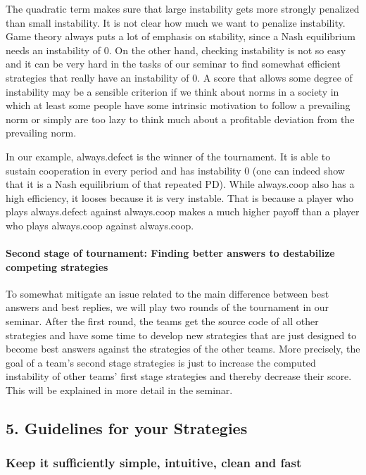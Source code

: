 \documentclass[]{article}
\begin{document}
The quadratic term makes sure that large instability gets more strongly
penalized than small instability. It is not clear how much we want to
penalize instability. Game theory always puts a lot of emphasis on
stability, since a Nash equilibrium needs an instability of 0. On the
other hand, checking instability is not so easy and it can be very hard
in the tasks of our seminar to find somewhat efficient strategies that
really have an instability of 0. A score that allows some degree of
instability may be a sensible criterion if we think about norms in a
society in which at least some people have some intrinsic motivation to
follow a prevailing norm or simply are too lazy to think much about a
profitable deviation from the prevailing norm.

In our example, always.defect is the winner of the tournament. It is
able to sustain cooperation in every period and has instability 0 (one
can indeed show that it is a Nash equilibrium of that repeated PD).
While always.coop also has a high efficiency, it looses because it is
very instable. That is because a player who plays always.defect against
always.coop makes a much higher payoff than a player who plays
always.coop against always.coop.

\paragraph{Second stage of tournament: Finding better answers to
destabilize competing strategies}

To somewhat mitigate an issue related to the main difference between
best answers and best replies, we will play two rounds of the tournament
in our seminar. After the first round, the teams get the source code of
all other strategies and have some time to develop new strategies that
are just designed to become best answers against the strategies of the
other teams. More precisely, the goal of a team's second stage
strategies is just to increase the computed instability of other teams'
first stage strategies and thereby decrease their score. This will be
explained in more detail in the seminar.

\subsection{5. Guidelines for your Strategies}

\subsubsection{Keep it sufficiently simple, intuitive, clean and fast}
\end{document}
